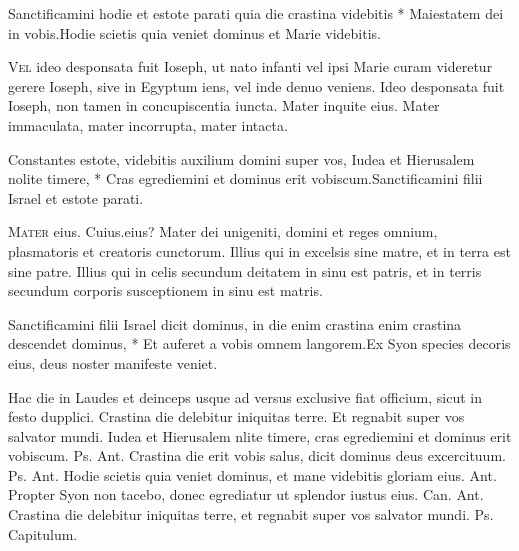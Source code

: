 \begin{multicols*}{2}
\begin{responsory}
{Sanctificamini hodie et estote parati quia die crastina videbitis * Maiestatem dei in vobis.}{Hodie scietis quia veniet dominus et Marie videbitis.}
\end{responsory}
\lettrine[lines=2]{\zallmancaps \color{Blue} V}{el} ideo desponsata fuit Ioseph, ut nato infanti vel ipsi Marie curam videretur gerere Ioseph, sive in Egyptum iens, vel inde denuo veniens. Ideo desponsata fuit Ioseph, non tamen in concupiscentia iuncta. Mater inquite eius. Mater immaculata, mater incorrupta, mater intacta.
\begin{responsory}
{Constantes estote, videbitis auxilium domini super vos, Iudea et Hierusalem nolite timere, * Cras egrediemini et dominus erit vobiscum.}{Sanctificamini filii Israel et estote parati.}
\end{responsory}
\lettrine[lines=2]{\zallmancaps \color{Red} M}{ater} eius. Cuius.eius? Mater dei unigeniti, domini et reges omnium, plasmatoris et creatoris cunctorum. Illius qui in excelsis sine matre, et in terra est sine patre. Illius qui in celis secundum deitatem in sinu est patris, et in terris secundum corporis susceptionem in sinu est matris.
\begin{responsory-doxology}
{Sanctificamini filii Israel dicit dominus, in die enim crastina enim crastina descendet dominus, * Et auferet a vobis omnem langorem.}{Ex Syon species decoris eius, deus noster manifeste veniet.}
\end{responsory-doxology}
\newline Hac die in Laudes et deinceps usque ad versus exclusive fiat officium, sicut in festo dupplici. \V Crastina die delebitur iniquitas terre. \R Et regnabit super vos salvator mundi.
 Iudea et Hierusalem nlite timere, cras egrediemini et dominus erit vobiscum. {\color{Red} Ps.}  {\color{Red} Ant.} Crastina die erit vobis salus, dicit dominus deus excercituum. {\color{Red} Ps.}  {\color{Red} Ant.} Hodie scietis quia veniet dominus, et mane videbitis gloriam eius.  {\color{Red} Ant.} Propter Syon non tacebo, donec egrediatur ut splendor iustus eius. {\color{Red} Can.}  {\color{Red} Ant.} Crastina die delebitur iniquitas terre, et regnabit super vos salvator mundi. {\color{Red} Ps.}  {\color{Red} Capitulum.}

\end{multicols*}
